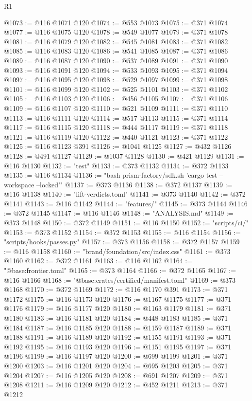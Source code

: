 \begin{lexlean}{R1}
\begin{coremodule}
@1073 := @116 @1071 @120
@1074 := @553 @1073
@1075 := @371 @1074
@1077 := @116 @1075 @120
@1078 := @549 @1077
@1079 := @371 @1078
@1081 := @116 @1079 @120
@1082 := @545 @1081
@1083 := @371 @1082
@1085 := @116 @1083 @120
@1086 := @541 @1085
@1087 := @371 @1086
@1089 := @116 @1087 @120
@1090 := @537 @1089
@1091 := @371 @1090
@1093 := @116 @1091 @120
@1094 := @533 @1093
@1095 := @371 @1094
@1097 := @116 @1095 @120
@1098 := @529 @1097
@1099 := @371 @1098
@1101 := @116 @1099 @120
@1102 := @525 @1101
@1103 := @371 @1102
@1105 := @116 @1103 @120
@1106 := @456 @1105
@1107 := @371 @1106
@1109 := @116 @1107 @120
@1110 := @521 @1109
@1111 := @371 @1110
@1113 := @116 @1111 @120
@1114 := @517 @1113
@1115 := @371 @1114
@1117 := @116 @1115 @120
@1118 := @444 @1117
@1119 := @371 @1118
@1121 := @116 @1119 @120
@1122 := @440 @1121
@1123 := @371 @1122
@1125 := @116 @1123 @391
@1126 := @1041 @1125
@1127 := @432 @1126
@1128 := @491 @1127
@1129 := @1037 @1128
@1130 := @421 @1129
@1131 := @116 @1130
@1132 := "test"
@1133 := @373 @1132
@1134 := @372 @1133
@1135 := @116 @1134
@1136 := "bash prism-factory/sdk.sh 'cargo test --workspace --locked'"
@1137 := @373 @1136
@1138 := @372 @1137
@1139 := @116 @1138
@1140 := "lift-verdicts.toml"
@1141 := @373 @1140
@1142 := @372 @1141
@1143 := @116 @1142
@1144 := "features/"
@1145 := @373 @1144
@1146 := @372 @1145
@1147 := @116 @1146
@1148 := "ANALYSIS.md"
@1149 := @373 @1148
@1150 := @372 @1149
@1151 := @116 @1150
@1152 := "scripts/ci/"
@1153 := @373 @1152
@1154 := @372 @1153
@1155 := @116 @1154
@1156 := "scripts/hooks/passes.py"
@1157 := @373 @1156
@1158 := @372 @1157
@1159 := @116 @1158
@1160 := "brand/foundation/src/index.css"
@1161 := @373 @1160
@1162 := @372 @1161
@1163 := @116 @1162
@1164 := "@base:frontier.toml"
@1165 := @373 @1164
@1166 := @372 @1165
@1167 := @116 @1166
@1168 := "@base:crates/certified/manifest.toml"
@1169 := @373 @1168
@1170 := @372 @1169
@1172 := @116 @1170 @391
@1173 := @371 @1172
@1175 := @116 @1173 @120
@1176 := @1167 @1175
@1177 := @371 @1176
@1179 := @116 @1177 @120
@1180 := @1163 @1179
@1181 := @371 @1180
@1183 := @116 @1181 @120
@1184 := @448 @1183
@1185 := @371 @1184
@1187 := @116 @1185 @120
@1188 := @1159 @1187
@1189 := @371 @1188
@1191 := @116 @1189 @120
@1192 := @1155 @1191
@1193 := @371 @1192
@1195 := @116 @1193 @120
@1196 := @1151 @1195
@1197 := @371 @1196
@1199 := @116 @1197 @120
@1200 := @699 @1199
@1201 := @371 @1200
@1203 := @116 @1201 @120
@1204 := @695 @1203
@1205 := @371 @1204
@1207 := @116 @1205 @120
@1208 := @691 @1207
@1209 := @371 @1208
@1211 := @116 @1209 @120
@1212 := @452 @1211
@1213 := @371 @1212

\end{coremodule}
\end{lexlean}
